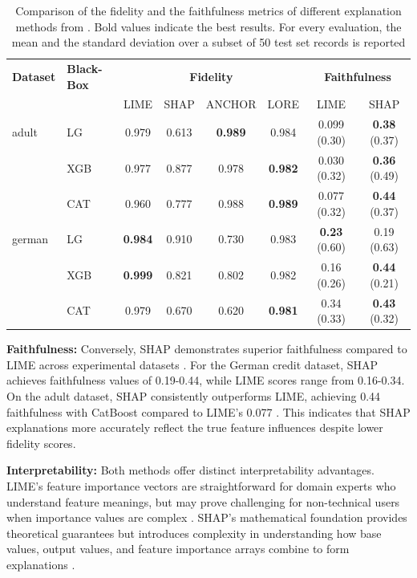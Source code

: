 \begin{table}[ht]
    \centering
    \caption{Comparison of the fidelity and the faithfulness metrics of different explanation methods from \cite{bodria2023benchmarking}. Bold values indicate the best results. For every evaluation, the mean and the standard deviation over a subset of 50 test set records is reported}
    \label{tab:fidelity_faithfulness}
    \begin{adjustbox}{width=\textwidth,center}
    \begin{tabular}{llcccccc}
        \hline
        \textbf{Dataset} & \textbf{Black-Box} & \multicolumn{4}{c}{\textbf{Fidelity}} & \multicolumn{2}{c}{\textbf{Faithfulness}} \\
        \cline{3-6} \cline{7-8}
         &  & LIME & SHAP & ANCHOR & LORE & LIME & SHAP \\
        \hline
        adult  & LG  & 0.979 & 0.613 & \textbf{0.989} & 0.984 & 0.099 (0.30) & \textbf{0.38} (0.37) \\
               & XGB & 0.977 & 0.877 & 0.978 & \textbf{0.982} & 0.030 (0.32) & \textbf{0.36} (0.49) \\
               & CAT & 0.960 & 0.777 & 0.988 & \textbf{0.989} & 0.077 (0.32) & \textbf{0.44} (0.37) \\
        \hline
        german & LG  & \textbf{0.984} & 0.910 & 0.730 & 0.983 & \textbf{0.23 }(0.60)  & 0.19 (0.63) \\
               & XGB & \textbf{0.999} & 0.821 & 0.802 & 0.982 & 0.16 (0.26)  & \textbf{0.44 }(0.21) \\
               & CAT & 0.979 & 0.670 & 0.620 & \textbf{0.981} & 0.34 (0.33)  & \textbf{0.43 }(0.32) \\
        \hline
    \end{tabular}
    \end{adjustbox}
\end{table}

\textbf{Faithfulness:} Conversely, SHAP demonstrates superior faithfulness compared to LIME across experimental datasets \cite{bodria2023benchmarking}. For the German credit dataset, SHAP achieves faithfulness values of 0.19-0.44, while LIME scores range from 0.16-0.34. On the adult dataset, SHAP consistently outperforms LIME, achieving 0.44 faithfulness with CatBoost compared to LIME's 0.077 \cite{bodria2023benchmarking}. This indicates that SHAP explanations more accurately reflect the true feature influences despite lower fidelity scores.

\textbf{Interpretability:} Both methods offer distinct interpretability advantages. LIME's feature importance vectors are straightforward for domain experts who understand feature meanings, but may prove challenging for non-technical users when importance values are complex \cite{lundberg2017unified, bodria2023benchmarking}. SHAP's mathematical foundation provides theoretical guarantees but introduces complexity in understanding how base values, output values, and feature importance arrays combine to form explanations \cite{bodria2023benchmarking}.

